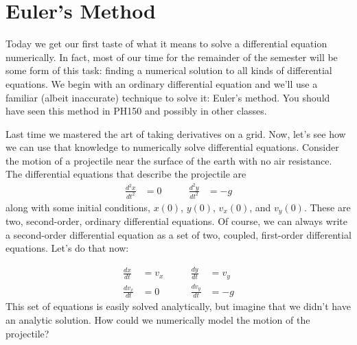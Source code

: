 \chapter{Euler's Method}
\label{Lab:Euler's Method}

  Today we get our first
taste of what it means to solve a differential equation numerically.
In fact, most of our time for the remainder of the semester will be
some form of this task: finding a numerical solution to all kinds of
differential equations.  We begin with an ordinary differential
equation and we'll use a familiar (albeit inaccurate) technique to
solve it: Euler's method.  You should have seen this method in PH150
and possibly in other classes.


Last time we mastered the art of taking derivatives on a grid.  Now,
let's see how we can use that knowledge to numerically solve
differential equations. Consider the motion of a projectile near the
surface of the earth with no air resistance. The differential
equations that describe the projectile are
\begin{equation}\label{eq:SimpleProjectile}
    \begin{aligned}
    \frac{d^2 x}{dt^2} &= 0
    & \qquad
    \frac{d^2 y}{dt^2} &= -g
    \end{aligned}
\end{equation}
along with some initial conditions, $x(0)$, $y(0)$, $v_x(0)$, and
$v_y(0)$.  These are two, second-order, ordinary differential
equations.   Of
course, we can always write a second-order differential equation as a
set of two, coupled, first-order differential equations.  Let's do
that now:


\begin{equation}\label{eq:SimpleProjectile}
    \begin{aligned}
    \frac{d x}{dt} &= v_x
    & \qquad
    \frac{d y}{dt} &= v_y \\
    \frac{d v_x}{dt} &= 0
    & \qquad
    \frac{d v_y}{dt} &= -g
    \end{aligned}
\end{equation}
This set of equations is easily solved analytically, but
imagine that we didn't have an analytic solution.  How could we
numerically model the motion of the projectile?

